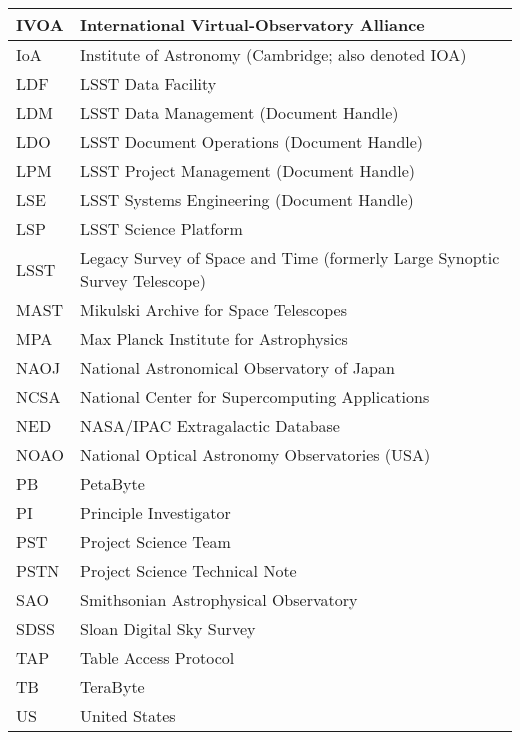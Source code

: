 \begin{longtable}{p{}p{}}
IVOA & International Virtual-Observatory Alliance \\\hline
IoA & Institute of Astronomy (Cambridge; also denoted IOA) \\\hline
LDF & LSST Data Facility \\\hline
LDM & LSST Data Management (Document Handle) \\\hline
LDO & LSST Document Operations (Document Handle) \\\hline
LPM & LSST Project Management (Document Handle) \\\hline
LSE & LSST Systems Engineering (Document Handle) \\\hline
LSP & LSST Science Platform \\\hline
LSST & Legacy Survey of Space and Time (formerly Large Synoptic Survey Telescope) \\\hline
MAST & Mikulski Archive for Space Telescopes \\\hline
MPA & Max Planck Institute for Astrophysics \\\hline
NAOJ & National Astronomical Observatory of Japan \\\hline
NCSA & National Center for Supercomputing Applications \\\hline
NED & NASA/IPAC Extragalactic Database \\\hline
NOAO & National Optical Astronomy Observatories (USA) \\\hline
PB & PetaByte \\\hline
PI & Principle Investigator \\\hline
PST & Project Science Team \\\hline
PSTN & Project Science Technical Note \\\hline
SAO & Smithsonian Astrophysical Observatory \\\hline
SDSS & Sloan Digital Sky Survey \\\hline
TAP & Table Access Protocol \\\hline
TB & TeraByte \\\hline
US & United States \\\hline
\end{longtable}
